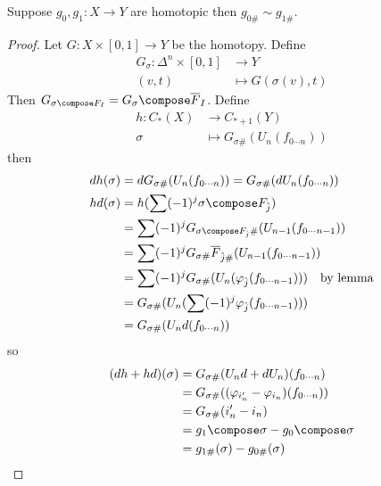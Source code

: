\documentclass[a4paper]{article}
\begin{document}
\begin{theorem}
  Suppose \(g_0, g_1: X \to Y\) are homotopic then \(g_{0\#} \sim g_{1\#}\).
\end{theorem}

\begin{proof}
  Let \(G: X \times [0, 1] \to Y\) be the homotopy. Define
  \begin{align*}
    G_\sigma: \Delta^n \times [0, 1] &\to Y \\
    (v, t) &\mapsto G(\sigma(v), t)
  \end{align*}
  Then \(G_{\sigma \compose F_I} = G_\sigma \compose \overline F_I\). Define
  \begin{align*}
    h: C_*(X) &\to C_{* + 1}(Y) \\
    \sigma &\mapsto G_{\sigma \#} (U_n (f_{0 \cdots n}))
  \end{align*}
  then
  \begin{align*}
    dh(\sigma) &= d G_{\sigma \#} (U_n (f_{0 \cdots n})) = G_{\sigma \#} (d U_n(f_{0 \cdots n})) \\
    hd(\sigma) &= h (\sum (-1)^j \sigma \compose F_{\hat j}) \\
               &= \sum (-1)^j G_{\sigma \compose F_{\hat j} \#} (U_{n - 1} (f_{0 \cdots n - 1})) \\
               &= \sum (-1)^j G_{\sigma \#} \overline F_{\hat j\#} (U_{n - 1}(f_{0 \cdots n - 1})) \\
               &= \sum (-1)^j G_{\sigma \#} (U_n(\varphi_{\hat j} (f_{0 \cdots n - 1}))) \quad \text{by lemma} \\
               &= G_{\sigma \#} (U_n (\sum (-1)^j \varphi_{\hat j} (f_{0 \cdots n - 1}))) \\
               &= G_{\sigma \#} (U_n d(f_{0 \cdots n}))
  \end{align*}
  so
  \begin{align*}
    (dh + hd)(\sigma) &= G_{\sigma \#} (U_nd + dU_n) (f_{0 \cdots n}) \\
                      &= G_{\sigma \#} ((\varphi_{i_n'} - \varphi_{i_n}) (f_{0 \cdots n})) \\
                      &= G_{\sigma \#} (i_n' - i_n) \\
                      &= g_1 \compose \sigma - g_0 \compose \sigma \\
                      &= g_{1\#}(\sigma) - g_{0\#}(\sigma)
  \end{align*}
\end{proof}
\end{document}
